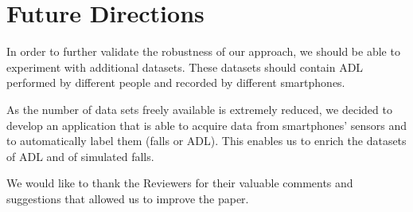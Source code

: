 \documentclass[twocolumn]{svjour3}          \smartqed  \usepackage[draft]{hyperref}
\begin{document}
\section{Future Directions}
\label{sec:future}
In order to further validate the robustness of our approach, we should be able to experiment with additional datasets. These datasets should contain ADL performed by different people and recorded by different smartphones.

As the number of data sets freely available is extremely reduced, we decided to develop an application that is able to acquire data from smartphones' sensors and to automatically label them (falls or ADL). This enables us to enrich the datasets of ADL and of simulated falls.



\begin{acknowledgements}
We would like to thank the Reviewers for their valuable comments and suggestions that allowed us to improve the paper.
\end{acknowledgements}
\end{document}
